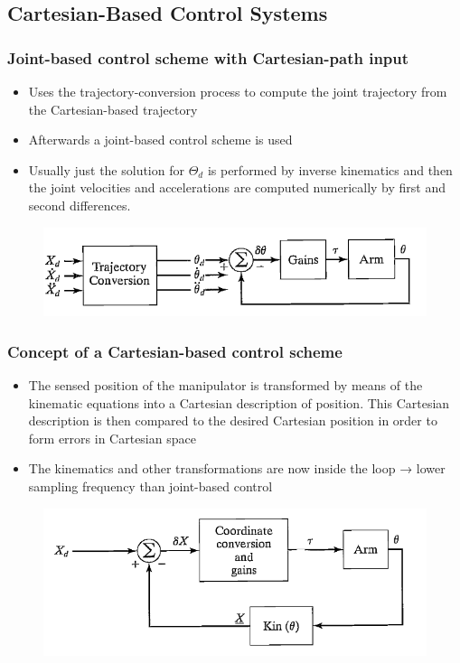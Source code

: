 \documentclass[10pt,a4paper]{article}
\begin{document}
\subsection{Cartesian-Based Control Systems}
\subsubsection{Joint-based control scheme with Cartesian-path input}
\begin{itemize}
	\item Uses the trajectory-conversion process to compute the joint trajectory from the Cartesian-based trajectory
	\item Afterwards a joint-based control scheme is used
	\item Usually just the solution for $\Theta_d$ is performed by inverse kinematics and then the joint velocities and accelerations are computed numerically by first and second differences.
\end{itemize}
\begin{figure}[H]
	\includegraphics[width=0.5\columnwidth]{imgs/control_with_cartesian_input.png}
\end{figure}

\subsubsection{Concept of a Cartesian-based control scheme}
\begin{itemize}
	\item The sensed position of the manipulator is transformed by means of the kinematic equations into a Cartesian description of position. This Cartesian description is then compared to the desired Cartesian position in order to form errors in Cartesian space
	\item The kinematics and other transformations are now inside the loop → lower sampling frequency than joint-based control
\end{itemize}

\begin{figure}[H]
\includegraphics[width=0.5\columnwidth]{imgs/control_cartesian_basic.png}
\end{figure}
\end{document}
